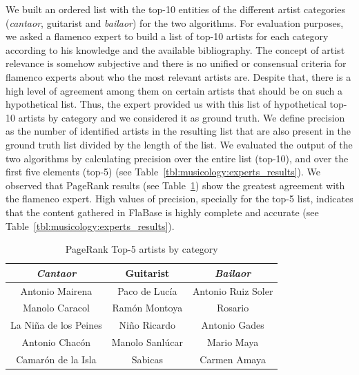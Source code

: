 We built an ordered list with the top-10 entities of the different artist categories (\textit{cantaor}, guitarist and \textit{bailaor}) for the two algorithms. For evaluation purposes, we asked a flamenco expert to build a list of top-10 artists for each category according to his knowledge and the available bibliography. The concept of artist relevance is somehow subjective and there is no unified or consensual criteria for flamenco experts about who the most relevant artists are. Despite that, there is a high level of agreement among them on certain artists that should be on such a hypothetical list. Thus, the expert provided us with this list of hypothetical top-10 artists by category and we considered it as ground truth. We define precision as the number of identified artists in the resulting list that are also present in the ground truth list divided by the length of the list. We evaluated the output of the two algorithms by calculating precision over the entire list (top-10), and over the first five elements (top-5) (see Table~\ref{tbl:musicology:experts_results}). We observed that Page\-Rank results (see Table~\ref{tbl:musicology:pagerank}) show the greatest agreement with the flamenco expert. 
High values of precision, specially for the top-5 list, indicates that the content gathered in FlaBase is highly complete and accurate (see Table~\ref{tbl:musicology:experts_results}). 

\begin{table}[!ht]
    \centering
    \begin{tabular}{|c|c|c|}
    \hline
    \textit{Cantaor} & Guitarist & \textit{Bailaor} \\
    \hline
Antonio Mairena & Paco de Luc\'{i}a & Antonio Ruiz Soler \\
Manolo Caracol & Ram\'{o}n Montoya & Rosario \\
La Ni\~{n}a de los Peines & Ni\~{n}o Ricardo & Antonio Gades \\
Antonio Chac\'{o}n & Manolo Sanl\'{u}car & Mario Maya \\
Camar\'{o}n de la Isla & Sabicas & Carmen Amaya \\
    \hline
    \end{tabular}
    \caption{PageRank Top-5 artists by category}    
    \label{tbl:musicology:pagerank}
\end{table}


